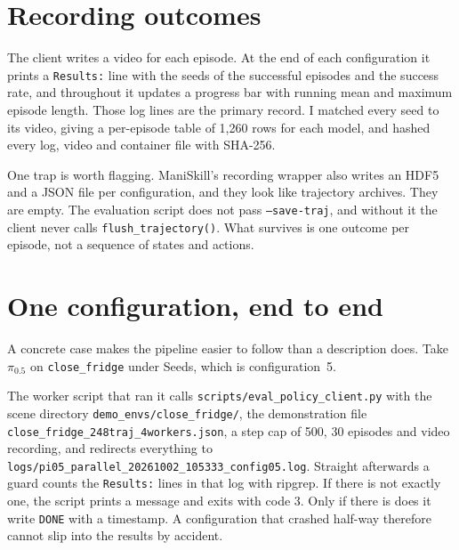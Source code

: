\section{Recording outcomes}
\label{sec:recording}

The client writes a video for each episode. At the end of each configuration it prints a \texttt{Results:} line with the seeds of the successful episodes and the success rate, and throughout it updates a progress bar with running mean and maximum episode length. Those log lines are the primary record. I matched every seed to its video, giving a per-episode table of 1,260 rows for each model, and hashed every log, video and container file with SHA-256.

One trap is worth flagging. ManiSkill's recording wrapper also writes an HDF5 and a JSON file per configuration, and they look like trajectory archives. They are empty. The evaluation script does not pass \texttt{--save-traj}, and without it the client never calls \texttt{flush\_trajectory()}. What survives is one outcome per episode, not a sequence of states and actions.

\section{One configuration, end to end}
\label{sec:worked-example}

A concrete case makes the pipeline easier to follow than a description does. Take $\pi_{0.5}$ on \texttt{close\_fridge} under Seeds, which is configuration~5.

The worker script that ran it calls \texttt{scripts/eval\_policy\_client.py} with the scene directory \texttt{demo\_envs/close\_fridge/}, the demonstration file \texttt{close\_fridge\_248traj\_4workers.json}, a step cap of 500, 30 episodes and video recording, and redirects everything to \texttt{logs/pi05\_parallel\_20261002\_105333\_config05.log}. Straight afterwards a guard counts the \texttt{Results:} lines in that log with ripgrep. If there is not exactly one, the script prints a message and exits with code 3. Only if there is does it write \texttt{DONE} with a timestamp. A configuration that crashed half-way therefore cannot slip into the results by accident.

